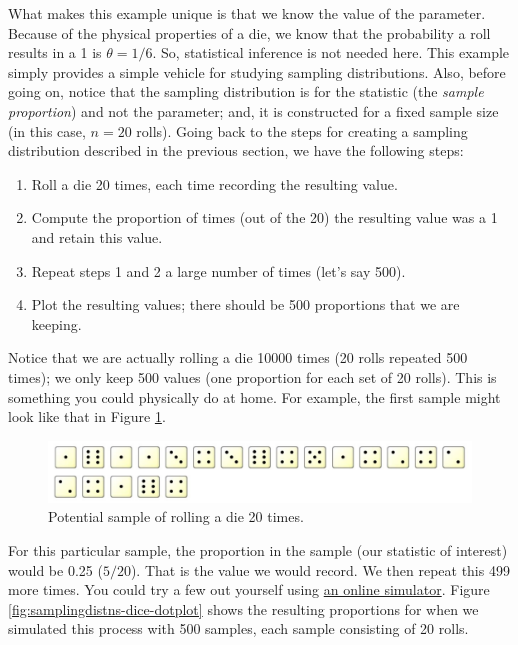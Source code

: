 \documentclass[
]{book}
\providecommand{\tightlist}{%
  \setlength{\itemsep}{0pt}\setlength{\parskip}{0pt}}
\theoremstyle{plain}
\theoremstyle{mydefn}
\theoremstyle{myexmpl}
\theoremstyle{remark}
\begin{document}
What makes this example unique is that we know the value of the parameter. Because of the physical properties of a die, we know that the probability a roll results in a 1 is \(\theta = 1/6\). So, statistical inference is not needed here. This example simply provides a simple vehicle for studying sampling distributions. Also, before going on, notice that the sampling distribution is for the statistic (the \emph{sample proportion}) and not the parameter; and, it is constructed for a fixed sample size (in this case, \(n = 20\) rolls). Going back to the steps for creating a sampling distribution described in the previous section, we have the following steps:

\begin{enumerate}
\def\labelenumi{\arabic{enumi}.}
\tightlist
\item
  Roll a die 20 times, each time recording the resulting value.
\item
  Compute the proportion of times (out of the 20) the resulting value was a 1 and retain this value.
\item
  Repeat steps 1 and 2 a large number of times (let's say 500).
\item
  Plot the resulting values; there should be 500 proportions that we are keeping.
\end{enumerate}

Notice that we are actually rolling a die 10000 times (20 rolls repeated 500 times); we only keep 500 values (one proportion for each set of 20 rolls). This is something you could physically do at home. For example, the first sample might look like that in Figure \ref{fig:samplingdistns-dice-example}.

\begin{figure}

{\centering \includegraphics[width=0.8\linewidth]{./images/SamplingDistns-Dice-Example} 

}

\caption{Potential sample of rolling a die 20 times.}\label{fig:samplingdistns-dice-example}
\end{figure}

For this particular sample, the proportion in the sample (our statistic of interest) would be 0.25 (\(5/20\)). That is the value we would record. We then repeat this 499 more times. You could try a few out yourself using \href{https://www.random.org/dice/?num=20}{an online simulator}. Figure \ref{fig:samplingdistns-dice-dotplot} shows the resulting proportions for when we simulated this process with 500 samples, each sample consisting of 20 rolls.
\end{document}
